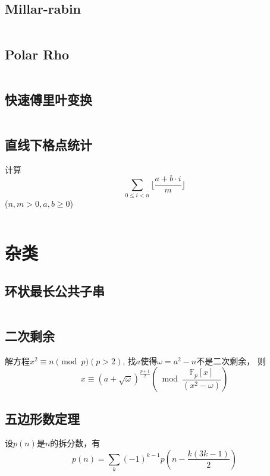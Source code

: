 \documentclass[a4paper]{article}
\newcommand{\cppcode}[1]{
    \inputminted[mathescape]{cpp}{source/#1}
}
\begin{document}
\subsection{Millar-rabin}

\cppcode{millar-rabin.cpp}

\subsection{Polar Rho}

\cppcode{pollard-rho.cpp}

\subsection{快速傅里叶变换}

\cppcode{fast-fourier-transform.cpp}

\subsection{直线下格点统计}

计算$$\sum_{0 \leq i < n} \lfloor \frac{a + b \cdot i}{m} \rfloor$$
($n, m > 0, a, b \geq 0$)
\cppcode{lattice-count.cpp}

\section{杂类}

\subsection{环状最长公共子串}

\cppcode{cyclic-longest-common-string.cpp}

\subsection{二次剩余}

解方程$x^2 \equiv n \pmod p (p > 2)$, 
找$a$使得$\omega = a^2 - n$不是二次剩余，
则$$x \equiv (a + \sqrt{\omega})^{\frac{p + 1}{2}} \left(\bmod \frac{\mathbb{F}_p[x]}{(x^2 - \omega)}\right)$$

\subsection{五边形数定理}

设$p(n)$是$n$的拆分数，有$$p(n) = \sum_{k} (-1)^{k - 1} p\left(n - \frac{k(3k - 1)}{2}\right)$$
\end{document}
